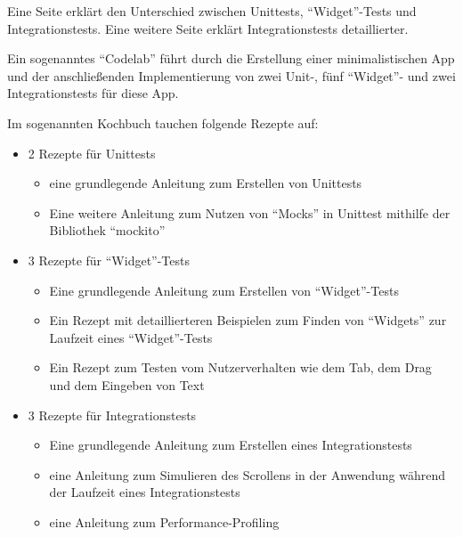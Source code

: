 Eine Seite erklärt den Unterschied zwischen Unittests, \enquote{Widget}-Tests und Integrationstests.
Eine weitere Seite erklärt Integrationstests detaillierter.

Ein sogenanntes \enquote{Codelab} führt durch die Erstellung einer minimalistischen App und der anschließenden Implementierung von zwei Unit-, fünf \enquote{Widget}- und zwei Integrationstests für diese App.

\clearpage
Im sogenannten Kochbuch tauchen folgende Rezepte auf:

\begin{itemize}[topsep=0pt,itemsep=-1ex,partopsep=1ex,parsep=1ex]
    \item 2 Rezepte für Unittests
    \begin{itemize} 
       \item eine grundlegende Anleitung zum Erstellen von Unittests 
       \item Eine weitere Anleitung zum Nutzen von \enquote{Mocks} in Unittest mithilfe der Bibliothek \enquote{mockito} 
    \end{itemize}
    \item 3 Rezepte für \enquote{Widget}-Tests
    \begin{itemize} 
        \item Eine grundlegende Anleitung zum Erstellen von \enquote{Widget}-Tests 
        \item Ein Rezept mit detaillierteren Beispielen zum Finden von \enquote{Widgets}  zur Laufzeit eines \enquote{Widget}-Tests 
        \item Ein Rezept zum Testen vom Nutzerverhalten wie dem Tab, dem Drag und dem Eingeben von Text 
     \end{itemize}
    \item 3 Rezepte für Integrationstests
    \begin{itemize} 
        \item Eine grundlegende Anleitung zum Erstellen eines Integrationstests 
        \item eine Anleitung zum Simulieren des Scrollens in der Anwendung während der Laufzeit eines Integrationstests 
        \item eine Anleitung zum Performance-Profiling 
     \end{itemize}
\end{itemize}


